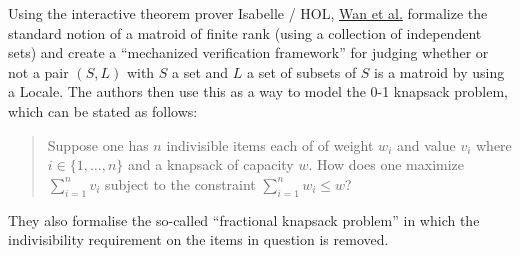 \documentclass[sigplan,10pt,anonymous,review]{acmart}\settopmatter{printfolios=true,printccs=false,printacmref=false}\usepackage{graphicx} %
\begin{document}
Using the interactive theorem prover Isabelle / HOL, \href{https://link.springer.com/chapter/10.1007/978-981-96-1621-3_18}{Wan et al.} 
formalize the standard notion of a matroid of finite rank (using a collection of independent sets) and create a ``mechanized verification framework''
for judging whether or not a pair $(S, L)$ with $S$ a set and $L$ a set of subsets of $S$ is a matroid by using a Locale. The authors then use
this as a way to model the 0-1 knapsack problem, which can be stated as follows:
\begin{quote}
    Suppose one has $n$ indivisible items each of of weight $w_i$ and value $v_i$ where $i \in \{1,\ldots, n\}$ and a knapsack of capacity $w$. 
    How does one maximize $\sum_{i=1}^n v_i$ subject to the constraint $\sum_{i=1}^n w_i \le w$?
\end{quote}
They also formalise the so-called ``fractional knapsack problem'' in which the indivisibility requirement on the items in question is removed.
\end{document}
